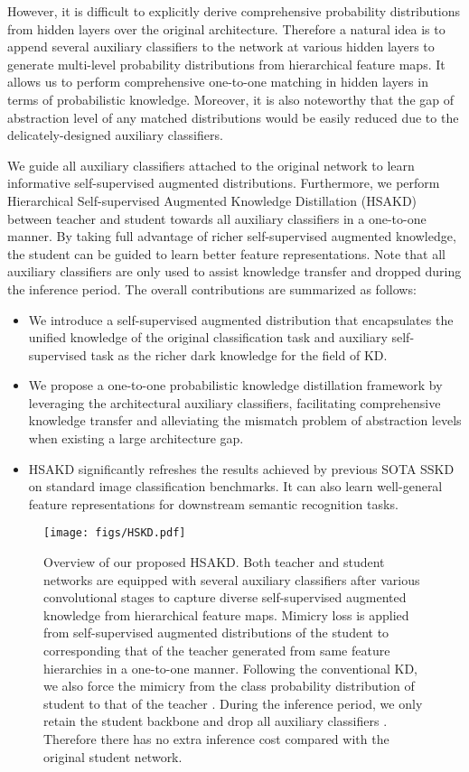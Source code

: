 \documentclass{article}
\begin{document}
However, it is difficult to explicitly derive comprehensive probability distributions from hidden layers over the original architecture. Therefore a natural idea is to append several auxiliary classifiers to the network at various hidden layers to generate multi-level probability distributions from hierarchical feature maps. It allows us to perform comprehensive one-to-one matching in hidden layers in terms of probabilistic knowledge. Moreover, it is also noteworthy that the gap of abstraction level of any matched distributions would be easily reduced due to the delicately-designed auxiliary classifiers.

We guide all auxiliary classifiers attached to the original network to learn informative self-supervised augmented distributions. Furthermore, we perform Hierarchical Self-supervised Augmented Knowledge Distillation (HSAKD) between teacher and student towards all auxiliary classifiers in a one-to-one manner. By taking full advantage of richer self-supervised augmented knowledge, the student can be guided to learn better feature representations. Note that all auxiliary classifiers are only used to assist knowledge transfer and dropped during the inference period. The overall contributions are summarized as follows:
\begin{itemize}[noitemsep,nolistsep,,topsep=0pt,parsep=0pt,partopsep=0pt]
	\item We introduce a self-supervised augmented distribution that encapsulates the unified knowledge of the original classification task and auxiliary self-supervised task as the richer dark knowledge for the field of KD. 
	\item We propose a one-to-one probabilistic knowledge distillation framework by leveraging the architectural auxiliary classifiers, facilitating comprehensive knowledge transfer and alleviating the mismatch problem of abstraction levels when existing a large architecture gap.
	\item HSAKD significantly refreshes the results achieved by previous SOTA SSKD on standard image classification benchmarks. It can also learn well-general feature representations for downstream semantic recognition tasks. 
\end{itemize}
\begin{figure*}[tbp]  
	\centering  
	\texttt{[image: figs/HSKD.pdf]}
	\caption{Overview of our proposed HSAKD. Both teacher and student networks are equipped with several auxiliary classifiers after various convolutional stages to capture diverse self-supervised augmented knowledge from hierarchical feature maps. Mimicry loss is applied from self-supervised augmented distributions of the student  to corresponding that of the teacher  generated from same feature hierarchies in a one-to-one manner. Following the conventional KD, we also force the mimicry from the class probability distribution of student  to that of the teacher . During the inference period, we only retain the student backbone  and drop all auxiliary classifiers . Therefore there has no extra inference cost compared with the original student network.}  
	\label{HSKD}

\end{figure*}
\end{document}
